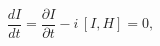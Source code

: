 \begin{equation}
\frac{dI}{dt}=\frac{\partial I}{\partial t}-i\,\left[ I,H\right] =0,
\label{4}
\end{equation}

